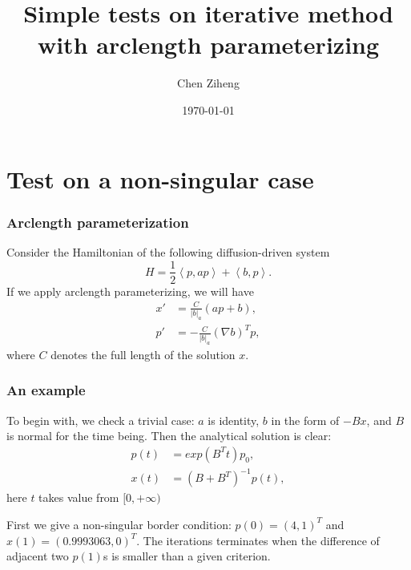 \documentclass[a4paper]{article}
\title{Simple tests on iterative method with arclength parameterizing}
\author{Chen Ziheng}
\date{\today}
\begin{document}
\maketitle
\part{Test on a non-singular case}
\section{Arclength parameterization}
Consider the Hamiltonian of the following diffusion-driven system
\begin{equation}
	H = \frac{1}{2} \left \langle p, ap \right \rangle + \left \langle b, p \right \rangle .
\end{equation}
If we apply arclength parameterizing, we will have
\begin{align}
	\label{eqn:arclength-param}
	x' &= \frac{C}{|b|_a}(ap+b), \\
	p' &= -\frac{C}{|b|_a}(\nabla b)^T p ,
\end{align}
where $C$ denotes the full length of the solution $x$.
\section{An example}
To begin with, we check a trivial case: $a$ is identity, $b$ in the form of $-Bx$, and $B$ is normal for the time being.
Then the analytical solution is clear:
\begin{align}
	p(t) &= exp(B^T t) p_0, \\
	x(t) &= (B + B^T)^{-1} p(t),
\end{align}
here $t$ takes value from $[0, +\infty)$

First we give a non-singular border condition: $p(0) = (4, 1)^T$ and $x(1) = (0.9993063, 0)^T$.
The iterations terminates when the difference of adjacent two $p(1)$s is smaller than a given criterion.
\end{document}
